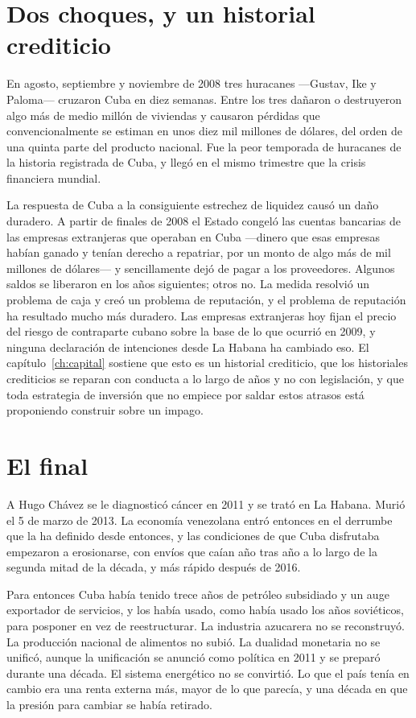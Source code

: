 \section{Dos choques, y un historial crediticio}

En agosto, septiembre y noviembre de 2008 tres huracanes ---Gustav, Ike y
Paloma--- cruzaron Cuba en diez semanas. Entre los tres dañaron o destruyeron algo
más de medio millón de viviendas y causaron pérdidas que convencionalmente se
estiman en unos diez mil millones de dólares, del orden de una quinta parte del
producto nacional.\unv{} Fue la peor temporada de huracanes de la historia
registrada de Cuba, y llegó en el mismo trimestre que la crisis financiera
mundial.

La respuesta de Cuba a la consiguiente estrechez de liquidez causó un daño
duradero. A partir de finales de 2008 el Estado congeló las cuentas bancarias de
las empresas extranjeras que operaban en Cuba ---dinero que esas empresas habían
ganado y tenían derecho a repatriar, por un monto de algo más de mil millones de
dólares--- y sencillamente dejó de pagar a los proveedores.\unv{} Algunos saldos
se liberaron en los años siguientes; otros no. La medida resolvió un problema de
caja y creó un problema de reputación, y el problema de reputación ha resultado
mucho más duradero. Las empresas extranjeras hoy fijan el precio del riesgo de
contraparte cubano sobre la base de lo que ocurrió en 2009, y ninguna declaración
de intenciones desde La Habana ha cambiado eso. El capítulo~\ref{ch:capital}
sostiene que esto es un historial crediticio, que los historiales crediticios se
reparan con conducta a lo largo de años y no con legislación, y que toda
estrategia de inversión que no empiece por saldar estos atrasos está proponiendo
construir sobre un impago.

\section{El final}

A Hugo Chávez se le diagnosticó cáncer en 2011 y se trató en La Habana. Murió el
5 de marzo de 2013. La economía venezolana entró entonces en el derrumbe que la ha
definido desde entonces, y las condiciones de que Cuba disfrutaba empezaron a
erosionarse, con envíos que caían año tras año a lo largo de la segunda mitad de
la década, y más rápido después de 2016.

Para entonces Cuba había tenido trece años de petróleo subsidiado y un auge
exportador de servicios, y los había usado, como había usado los años soviéticos,
para posponer en vez de reestructurar. La industria azucarera no se reconstruyó.
La producción nacional de alimentos no subió. La dualidad monetaria no se unificó,
aunque la unificación se anunció como política en 2011 y se preparó durante una
década. El sistema energético no se convirtió. Lo que el país tenía en cambio era
una renta externa más, mayor de lo que parecía, y una década en que la presión
para cambiar se había retirado.

